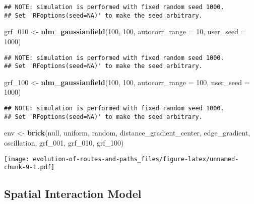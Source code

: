 \documentclass[]{elsarticle} %
\makeatletter
\newenvironment{Shaded}{\begin{snugshade}}{\end{snugshade}}
\newcommand{\KeywordTok}[1]{\textcolor[rgb]{0.13,0.29,0.53}{\textbf{{#1}}}}
\newcommand{\DataTypeTok}[1]{\textcolor[rgb]{0.13,0.29,0.53}{{#1}}}
\newcommand{\DecValTok}[1]{\textcolor[rgb]{0.00,0.00,0.81}{{#1}}}
\newcommand{\StringTok}[1]{\textcolor[rgb]{0.31,0.60,0.02}{{#1}}}
\newcommand{\NormalTok}[1]{{#1}}
\def\maxwidth{\ifdim\Gin@nat@width>\linewidth\linewidth
\else\Gin@nat@width\fi}
\let\Oldincludegraphics\includegraphics
\renewcommand{\includegraphics}[1]{\Oldincludegraphics[width=\maxwidth]{#1}}
\makeatother
\begin{document}
\begin{verbatim}
## NOTE: simulation is performed with fixed random seed 1000.
## Set 'RFoptions(seed=NA)' to make the seed arbitrary.
\end{verbatim}

\begin{Shaded}
\begin{Highlighting}[]
\NormalTok{grf_010 <-}\StringTok{ }\KeywordTok{nlm_gaussianfield}\NormalTok{(}\DecValTok{100}\NormalTok{, }\DecValTok{100}\NormalTok{, }\DataTypeTok{autocorr_range =} \DecValTok{10}\NormalTok{, }\DataTypeTok{user_seed =} \DecValTok{1000}\NormalTok{)}
\end{Highlighting}
\end{Shaded}

\begin{verbatim}
## NOTE: simulation is performed with fixed random seed 1000.
## Set 'RFoptions(seed=NA)' to make the seed arbitrary.
\end{verbatim}

\begin{Shaded}
\begin{Highlighting}[]
\NormalTok{grf_100 <-}\StringTok{ }\KeywordTok{nlm_gaussianfield}\NormalTok{(}\DecValTok{100}\NormalTok{, }\DecValTok{100}\NormalTok{, }\DataTypeTok{autocorr_range =} \DecValTok{100}\NormalTok{, }\DataTypeTok{user_seed =} \DecValTok{1000}\NormalTok{)}
\end{Highlighting}
\end{Shaded}

\begin{verbatim}
## NOTE: simulation is performed with fixed random seed 1000.
## Set 'RFoptions(seed=NA)' to make the seed arbitrary.
\end{verbatim}

\begin{Shaded}
\begin{Highlighting}[]
\NormalTok{env <-}\StringTok{ }\KeywordTok{brick}\NormalTok{(null, uniform, random, distance_gradient_center, edge_gradient, oscillation, grf_001, grf_010, grf_100)}
\end{Highlighting}
\end{Shaded}

\texttt{[image: evolution-of-routes-and-paths\_files/figure-latex/unnamed-chunk-9-1.pdf]}

\subsection{Spatial Interaction Model}\label{spatial-interaction-model}
\end{document}
